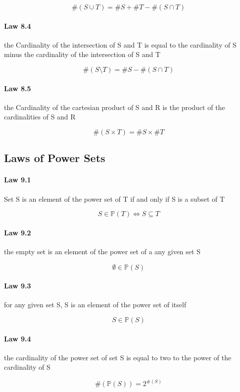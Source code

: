 \documentclass[twocolumn]{article}
\begin{document}
$$ \#(S  \cup  T) = \#S + \#T - \#(S  \cap  T) $$

\paragraph{Law 8.4} the Cardinality of the intersection of S and T is equal to the cardinality of S minus the cardinality of the intersection of S and T

$$ \#(S \setminus T) = \#S - \#(S  \cap  T) $$

\paragraph{Law 8.5} the Cardinality of the cartesian product of S and R is the product of the cardinalities of S and R

$$ \#(S \times T) = \#S  \times  \#T $$

\subsection{Laws of Power Sets}

\paragraph{Law 9.1} Set S is an element of the power set of T if and only if S is a subset of T

$$ S  \in  \mathbb{P} (T) \iff S  \subseteq  T $$

\paragraph{Law 9.2} the empty set is an element of the power set of a any given set S

$$  \emptyset  \in   \mathbb{P} (S) $$

\paragraph{Law 9.3} for any given set S, S is an element of the power set of itself

$$ S  \in  \mathbb{P} (S) $$

\paragraph{Law 9.4} the cardinality of the power set of set S is equal to two to the power of the cardinality of S

$$ \#( \mathbb{P} (S)) = 2^{\#(S)} $$
\end{document}
